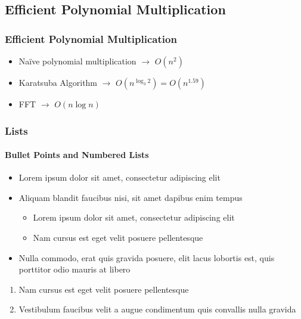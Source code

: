 \documentclass[
	11pt, %
]{beamer}
\begin{document}

\subsection{Efficient Polynomial Multiplication}
\begin{frame}
    \frametitle{Efficient Polynomial Multiplication}
    \begin{itemize}
        \item Naïve polynomial multiplication $\longrightarrow$ $O(n^2)$
        \item Karatsuba Algorithm $\longrightarrow$ $O(n^{\log_3 2}) = O(n^{1.59})$
        \item FFT $\longrightarrow$ $O(n\log n)$
    \end{itemize}

\end{frame}



\begin{frame}
    \frametitle{Lists}
    \framesubtitle{Bullet Points and Numbered Lists} %

    \begin{itemize}
        \item Lorem ipsum dolor sit amet, consectetur adipiscing elit
        \item Aliquam blandit faucibus nisi, sit amet dapibus enim tempus
              \begin{itemize}
                  \item Lorem ipsum dolor sit amet, consectetur adipiscing elit
                  \item Nam cursus est eget velit posuere pellentesque
              \end{itemize}
        \item Nulla commodo, erat quis gravida posuere, elit lacus lobortis est, quis porttitor odio mauris at libero
    \end{itemize}

    \bigskip %

    \begin{enumerate}
        \item Nam cursus est eget velit posuere pellentesque
        \item Vestibulum faucibus velit a augue condimentum quis convallis nulla gravida
    \end{enumerate}
\end{frame}
\end{document}

